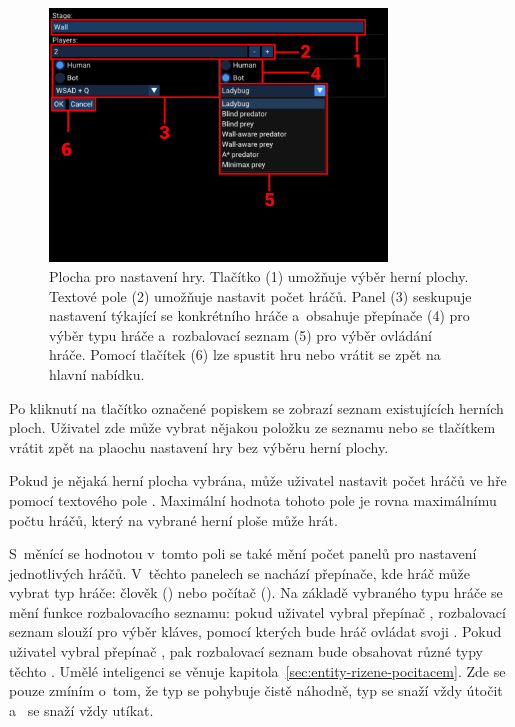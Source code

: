 \begin{figure}[ht]
    \centering
    \includegraphics[width=0.8\textwidth]{obrazky-figures/game-setup.pdf}
    \caption{Plocha pro nastavení hry. Tlačítko (1) umožňuje výběr herní plochy. Textové pole (2) umožňuje nastavit počet hráčů. Panel (3) seskupuje nastavení týkající se konkrétního hráče a~obsahuje přepínače (4) pro výběr typu hráče a~rozbalovací seznam (5) pro výběr ovládání hráče. Pomocí tlačítek (6) lze spustit hru nebo vrátit se zpět na hlavní nabídku.}
    \label{fig:game-setup}
\end{figure}

Po kliknutí na tlačítko označené popiskem  se zobrazí seznam existujících herních ploch. Uživatel zde může vybrat nějakou položku ze seznamu nebo se tlačítkem  vrátit zpět na plaochu nastavení hry bez výběru herní plochy.

Pokud je nějaká herní plocha vybrána, může uživatel nastavit počet hráčů ve hře pomocí textového pole . Maximální hodnota tohoto pole je rovna maximálnímu počtu hráčů, který na vybrané herní ploše může hrát.

S~měnící se hodnotou v~tomto poli se také mění počet panelů pro nastavení jednotlivých hráčů. V~těchto panelech se nachází přepínače, kde hráč může vybrat typ hráče: člověk () nebo počítač (). Na základě vybraného typu hráče se mění funkce rozbalovacího seznamu: pokud uživatel vybral přepínač , rozbalovací seznam slouží pro výběr kláves, pomocí kterých bude hráč ovládat svoji . Pokud uživatel vybral přepínač , pak rozbalovací seznam bude obsahovat různé typy těchto . Umělé inteligenci se věnuje kapitola~\ref{sec:entity-rizene-pocitacem}. Zde se pouze zmíním o~tom, že typ  se pohybuje čistě náhodně, typ  se snaží vždy útočit a~ se snaží vždy utíkat.

